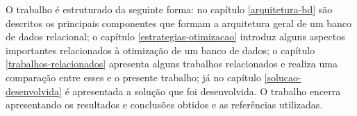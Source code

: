 O trabalho é estruturado da seguinte forma: no capítulo \ref{arquitetura-bd} são descritos os principais componentes que formam a arquitetura geral de um banco de dados relacional; o capítulo \ref{estrategias-otimizacao} introduz alguns aspectos importantes relacionados à otimização de um banco de dados; o capítulo \ref{trabalhos-relacionados} apresenta alguns trabalhos relacionados e realiza uma comparação entre esses e o presente trabalho; já no capítulo \ref{solucao-desenvolvida} é apresentada a solução que foi desenvolvida. O trabalho encerra apresentando os resultados e conclusões obtidos e as referências utilizadas.

